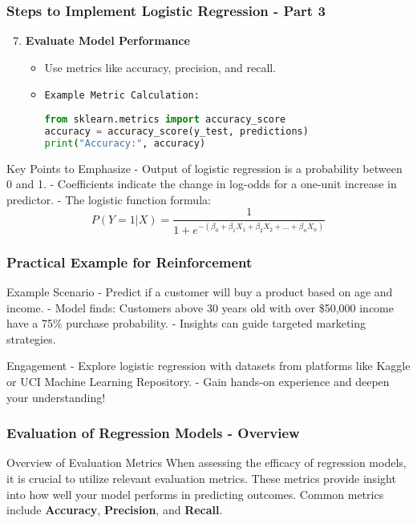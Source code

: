 \documentclass[aspectratio=169]{beamer}
\begin{document}
\begin{frame}
    \frametitle{Steps to Implement Logistic Regression - Part 3}
    \begin{enumerate}
        \setcounter{enumi}{6} %
        \item \textbf{Evaluate Model Performance}
        \begin{itemize}
            \item Use metrics like accuracy, precision, and recall.
            \item \texttt{Example Metric Calculation:}
            \begin{lstlisting}[language=Python]
from sklearn.metrics import accuracy_score
accuracy = accuracy_score(y_test, predictions)
print("Accuracy:", accuracy)
            \end{lstlisting}
        \end{itemize}
    \end{enumerate}

    \begin{block}{Key Points to Emphasize}
        - Output of logistic regression is a probability between 0 and 1.
        - Coefficients indicate the change in log-odds for a one-unit increase in predictor.
        - The logistic function formula: 
        \[
        P(Y=1|X) = \frac{1}{1 + e^{-(\beta_0 + \beta_1X_1 + \beta_2X_2 + ... + \beta_nX_n)}}
        \]
    \end{block}
\end{frame}

\begin{frame}
    \frametitle{Practical Example for Reinforcement}
    \begin{block}{Example Scenario}
        - Predict if a customer will buy a product based on age and income.
        - Model finds: Customers above 30 years old with over \$50,000 income have a 75\% purchase probability.
        - Insights can guide targeted marketing strategies.
    \end{block}

    \begin{block}{Engagement}
        - Explore logistic regression with datasets from platforms like Kaggle or UCI Machine Learning Repository.
        - Gain hands-on experience and deepen your understanding!
    \end{block}
\end{frame}

\begin{frame}[fragile]
    \frametitle{Evaluation of Regression Models - Overview}
    \begin{block}{Overview of Evaluation Metrics}
        When assessing the efficacy of regression models, it is crucial to utilize relevant evaluation metrics. These metrics provide insight into how well your model performs in predicting outcomes. Common metrics include \textbf{Accuracy}, \textbf{Precision}, and \textbf{Recall}.
    \end{block}
\end{frame}
\end{document}
